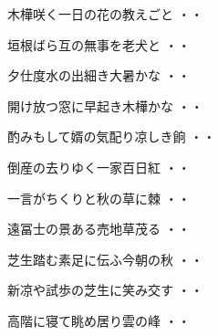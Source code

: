 \vspace{0.6cm}
\begin{shiika}木樺咲く一日の花の教えごと
\hfill{・・}\end{shiika}
\vspace{0.6cm}
\begin{shiika}垣根ばら互の無事を老犬と
\hfill{・・}\end{shiika}
\vspace{0.6cm}
\begin{shiika}夕仕度水の出細き大暑かな
\hfill{・・}\end{shiika}
\vspace{0.6cm}
\begin{shiika}開け放つ窓に早起き木樺かな
\hfill{・・}\end{shiika}
\vspace{0.6cm}
\begin{shiika}酌みもして婿の気配り凉しき餉
\hfill{・・}\end{shiika}
\vspace{0.6cm}
\begin{shiika}倒産の去りゆく一家百日紅
\hfill{・・}\end{shiika}
\vspace{0.6cm}
\begin{shiika}一言がちくりと秋の草に棘
\hfill{・・}\end{shiika}
\vspace{0.6cm}
\begin{shiika}遠冨士の景ある売地草茂る
\hfill{・・}\end{shiika}
\vspace{0.6cm}
\begin{shiika}芝生踏む素足に伝ふ今朝の秋
\hfill{・・}\end{shiika}
\vspace{0.6cm}
\begin{shiika}新凉や試歩の芝生に笑み交す
\hfill{・・}\end{shiika}
\vspace{0.6cm}
\begin{shiika}高階に寝て眺め居り雲の峰
\hfill{・・}\end{shiika}
\vspace{0.6cm}
